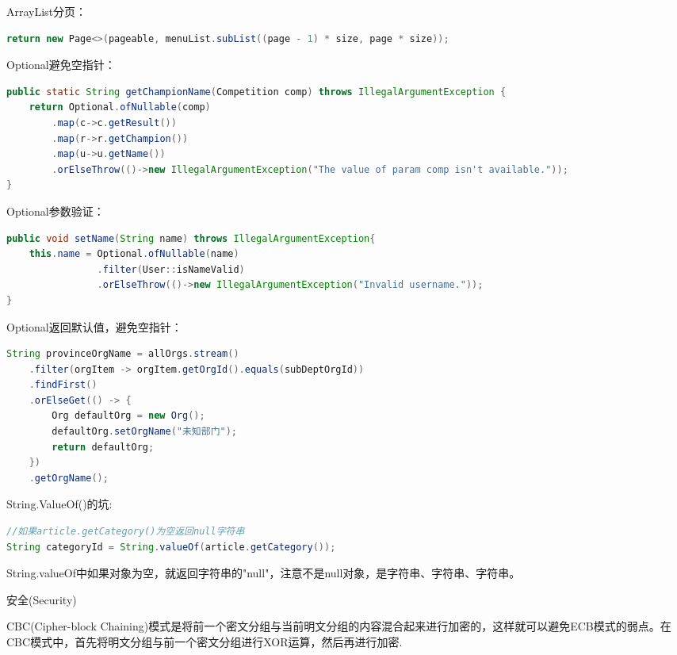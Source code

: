 \documentclass[12pt]{book}
\makeatletter
\numberwithin{dummy}{section}
\theoremstyle{ocrenumbox}
\theoremstyle{blacknumex}
\theoremstyle{blacknumbox}
\theoremstyle{ocrenum}
\renewcommand{\subsection}{\@startsection {subsection}{2}{\z@}
	{-3ex \@plus -0.1ex \@minus -.4ex}
	{0.5ex \@plus.2ex }
	{\normalfont\sffamily\bfseries}}
\makeatother
\begin{document}
ArrayList分页：

\begin{lstlisting}[language=Java]
return new Page<>(pageable, menuList.subList((page - 1) * size, page * size));
\end{lstlisting}

Optional避免空指针：

\begin{lstlisting}[language=Java]
public static String getChampionName(Competition comp) throws IllegalArgumentException {
	return Optional.ofNullable(comp)
		.map(c->c.getResult())
		.map(r->r.getChampion())
		.map(u->u.getName())
		.orElseThrow(()->new IllegalArgumentException("The value of param comp isn't available."));
}
\end{lstlisting}

Optional参数验证：

\begin{lstlisting}[language=Java]
public void setName(String name) throws IllegalArgumentException{
	this.name = Optional.ofNullable(name)
				.filter(User::isNameValid)
				.orElseThrow(()->new IllegalArgumentException("Invalid username."));
}
\end{lstlisting}

Optional返回默认值，避免空指针：

\begin{lstlisting}[language=Java]
String provinceOrgName = allOrgs.stream()
	.filter(orgItem -> orgItem.getOrgId().equals(subDeptOrgId))
	.findFirst()
	.orElseGet(() -> {
		Org defaultOrg = new Org();
		defaultOrg.setOrgName("未知部门");
		return defaultOrg;
	})
	.getOrgName();
\end{lstlisting}

String.ValueOf()的坑:

\begin{lstlisting}[language=Java]
//如果article.getCategory()为空返回null字符串
String categoryId = String.valueOf(article.getCategory());
\end{lstlisting}

String.valueOf中如果对象为空，就返回字符串的"null"，注意不是null对象，是字符串、字符串、字符串。

\subsection{安全(Security)}

CBC(Cipher-block Chaining)模式是将前一个密文分组与当前明文分组的内容混合起来进行加密的，这样就可以避免ECB模式的弱点。在CBC模式中，首先将明文分组与前一个密文分组进行XOR运算，然后再进行加密.
\end{document}
